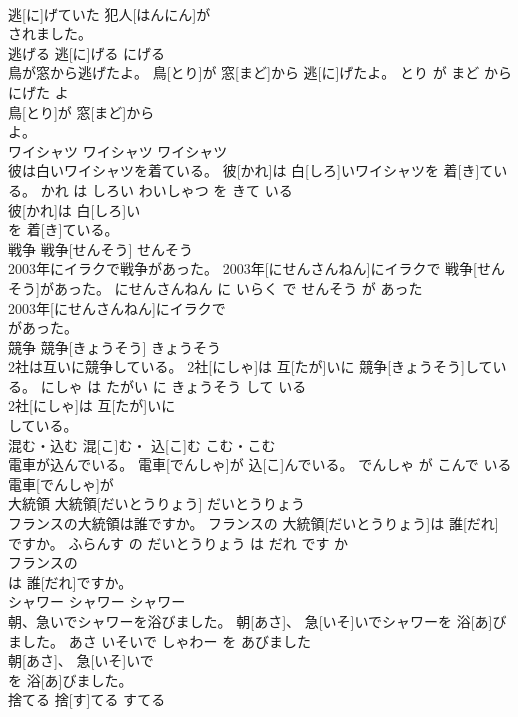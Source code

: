 \documentclass[8pt]{extreport}
\begin{document}
\begin{CJK}{UTF8}{min}
\\	逃[に]げていた 犯人[はんにん]が
\\	されました。			
\\	逃げる	逃[に]げる	にげる	
\\	鳥が窓から逃げたよ。	鳥[とり]が 窓[まど]から 逃[に]げたよ。	とり が まど から にげた よ	
\\	鳥[とり]が 窓[まど]から
\\	よ。			
\\	ワイシャツ	ワイシャツ	ワイシャツ	
\\	彼は白いワイシャツを着ている。	彼[かれ]は 白[しろ]いワイシャツを 着[き]ている。	かれ は しろい わいしゃつ を きて いる	
\\	彼[かれ]は 白[しろ]い
\\	を 着[き]ている。			
\\	戦争	戦争[せんそう]	せんそう	
\\	2003年にイラクで戦争があった。	2003年[にせんさんねん]にイラクで 戦争[せんそう]があった。	にせんさんねん に いらく で せんそう が あった	
\\	2003年[にせんさんねん]にイラクで
\\	があった。			
\\	競争	競争[きょうそう]	きょうそう	
\\	2社は互いに競争している。	2社[にしゃ]は 互[たが]いに 競争[きょうそう]している。	にしゃ は たがい に きょうそう して いる	
\\	2社[にしゃ]は 互[たが]いに
\\	している。			
\\	混む・込む	混[こ]む・ 込[こ]む	こむ・こむ	
\\	電車が込んでいる。	電車[でんしゃ]が 込[こ]んでいる。	でんしゃ が こんで いる	
\\	電車[でんしゃ]が
\\	大統領	大統領[だいとうりょう]	だいとうりょう	
\\	フランスの大統領は誰ですか。	フランスの 大統領[だいとうりょう]は 誰[だれ]ですか。	ふらんす の だいとうりょう は だれ です か	
\\	フランスの
\\	は 誰[だれ]ですか。			
\\	シャワー	シャワー	シャワー	
\\	朝、急いでシャワーを浴びました。	朝[あさ]、 急[いそ]いでシャワーを 浴[あ]びました。	あさ いそいで しゃわー を あびました	
\\	朝[あさ]、 急[いそ]いで
\\	を 浴[あ]びました。			
\\	捨てる	捨[す]てる	すてる	

\end{CJK}
\end{document}
